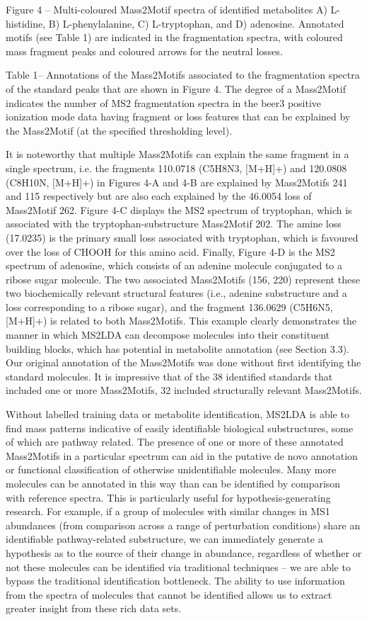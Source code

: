 Figure 4 – Multi-coloured Mass2Motif spectra of identified metabolites A) L-histidine, B) L-phenylalanine, C) L-tryptophan, and D) adenosine. Annotated motifs (see Table 1) are indicated in the fragmentation spectra, with coloured mass fragment peaks and coloured arrows for the neutral losses. 

Table 1– Annotations of the Mass2Motifs associated to the fragmentation spectra of the standard peaks that are shown in Figure 4. The degree of a Mass2Motif indicates the number of MS2 fragmentation spectra in the beer3 positive ionization mode data having fragment or loss features that can be explained by the Mass2Motif (at the specified thresholding level).

It is noteworthy that multiple Mass2Motifs can explain the same fragment in a single spectrum, i.e. the fragments 110.0718 (C5H8N3, [M+H]+)  and 120.0808 (C8H10N, [M+H]+) in Figures 4-A and 4-B are explained by Mass2Motifs 241 and 115 respectively but are also each explained by the 46.0054 loss of Mass2Motif 262. Figure 4-C displays the MS2 spectrum of tryptophan, which is associated with the tryptophan-substructure Mass2Motif 202. The amine loss (17.0235) is the primary small loss associated with tryptophan, which is favoured over the loss of CHOOH for this amino acid. Finally, Figure 4-D is the MS2 spectrum of adenosine, which consists of an adenine molecule conjugated to a ribose sugar molecule. The two associated Mass2Motifs (156, 220) represent these two biochemically relevant structural features (i.e., adenine substructure and a loss corresponding to a ribose sugar), and the fragment 136.0629 (C5H6N5, [M+H]+) is related to both Mass2Motifs. This example clearly demonstrates the manner in which MS2LDA can decompose molecules into their constituent building blocks, which has potential in metabolite annotation (see Section 3.3). Our original annotation of the Mass2Motifs was done without first identifying the standard molecules. It is impressive that of the 38 identified standards that included one or more Mass2Motifs, 32 included structurally relevant Mass2Motifs.

Without labelled training data or metabolite identification, MS2LDA is able to find mass patterns indicative of easily identifiable biological substructures, some of which are pathway related. The presence of one or more of these annotated Mass2Motifs in a particular spectrum can aid in the putative de novo annotation or functional classification of otherwise unidentifiable molecules. Many more molecules can be annotated in this way than can be identified by comparison with reference spectra. This is particularly useful for hypothesis-generating research. For example, if a group of molecules with similar changes in MS1 abundances (from comparison across a range of perturbation conditions) share an identifiable pathway-related substructure, we can immediately generate a hypothesis as to the source of their change in abundance, regardless of whether or not these molecules can be identified via traditional techniques – we are able to bypass the traditional identification bottleneck. The ability to use information from the spectra of molecules that cannot be identified allows us to extract greater insight from these rich data sets. 

